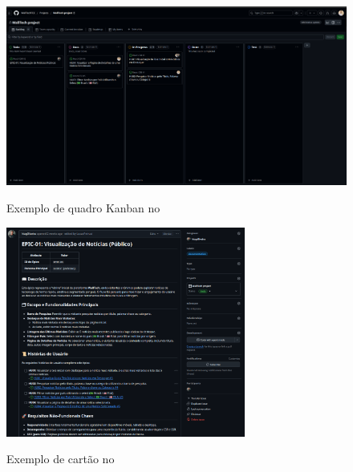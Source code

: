 \begin{figure}[H]
  \centering
  \caption{Exemplo de quadro Kanban no }
  \includegraphics[width=1.0\textwidth]{media/wall_tech_kanban.png}
  \label{fig:kanban-walltech}
\end{figure}

\begin{figure}[H]
  \centering
  \caption{Exemplo de cartão  no }
  \includegraphics[width=0.7\textwidth]{media/wall_tech_epic.png}
  \label{fig:kanban-userstories}
\end{figure}

